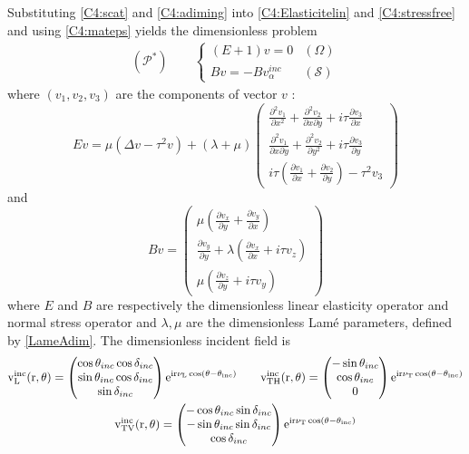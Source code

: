 Substituting \eqref{C4:scat} and \eqref{C4:adiming} into \eqref{C4:Elasticitelin} and \eqref{C4:stressfree} and using \eqref{C4:mateps} yields the dimensionless problem
\begin{eqnarray}
(\mathcal{P}^*) \hspace{2em} \left\{
\begin{array}{lr}
(E+1)v=0 & (\Omega) \\
Bv=-Bv_{\alpha}^{inc} & (\mathcal{S})
\end{array}
\right.
\label{C4:Padim}
\end{eqnarray}
where $(v_1,v_2,v_3)$ are the components of vector $v$ :
\begin{equation}
Ev=\mu (\Delta v -\tau^2 v)+(\lambda+\mu)
\begin{pmatrix}
\frac{\partial^2 v_1}{\partial x^2}+\frac{\partial^2 v_2}{\partial x \partial y} + i\tau\frac{\partial v_3}{\partial x} \\
\frac{\partial^2 v_1}{\partial x \partial y}+\frac{\partial^2 v_2}{\partial y^2}+ i\tau\frac{\partial v_3}{\partial y}\\
i\tau\left( \frac{\partial v_1}{\partial x}+\frac{\partial v_2}{\partial y}\right)-\tau^2 v_3
\end{pmatrix}
\label{C4:Eadim}
\end{equation}
and
\begin{equation}
Bv=\begin{pmatrix}
\mu \left(\frac{\partial v_x}{\partial y}+\frac{\partial v_y}{\partial x}\right) \\
\frac{\partial v_y}{\partial y}+\lambda\left( \frac{\partial v_x}{\partial x}+i\tau v_z\right)\\
\mu \left(\frac{\partial v_z}{\partial y}+i\tau v_y\right)
\end{pmatrix}
\label{C4:Badim}
\end{equation}
where $E$ and $B$ are respectively the dimensionless linear elasticity operator and normal stress operator and $\lambda,\mu$ are the dimensionless Lamé parameters, defined by \eqref{LameAdim}. The dimensionless incident field is
\begin{multline}
\rm v_L^{inc}(r,\theta)=\begin{pmatrix}
\cos \theta_{inc}\cos\delta_{inc} \\
\sin \theta_{inc}\cos\delta_{inc} \\
\sin\delta_{inc}
\end{pmatrix} e^{ir\nu_L \cos(\theta-\theta_{inc})}
\hspace{2em}
\rm v_{TH}^{inc}(r,\theta)=\begin{pmatrix}
-\sin \theta_{inc} \\
\cos \theta_{inc} \\
0
\end{pmatrix} e^{ir\nu_T \cos(\theta-\theta_{inc})} 
\\
\rm v_{TV}^{inc}(r,\theta)=\begin{pmatrix}
-\cos\theta_{inc}\sin\delta_{inc} \\
-\sin\theta_{inc}\sin\delta_{inc} \\
\cos\delta_{inc}
\end{pmatrix} e^{ir\nu_T \cos(\theta-\theta_{inc})} 
\label{C4:vinc}
\end{multline}
